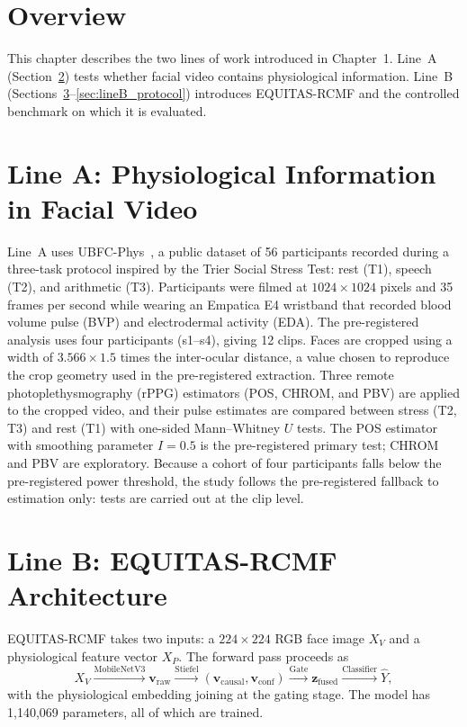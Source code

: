 \section{Overview}
This chapter describes the two lines of work introduced in Chapter~1. Line~A (Section~\ref{sec:lineA}) tests whether facial video contains physiological information. Line~B (Sections~\ref{sec:arch_overview}--\ref{sec:lineB_protocol}) introduces EQUITAS-RCMF and the controlled benchmark on which it is evaluated.

\section{Line A: Physiological Information in Facial Video}
\label{sec:lineA}
Line~A uses UBFC-Phys~\cite{sabour2023}, a public dataset of 56 participants recorded during a three-task protocol inspired by the Trier Social Stress Test: rest (T1), speech (T2), and arithmetic (T3). Participants were filmed at $1024 \times 1024$ pixels and 35 frames per second while wearing an Empatica E4 wristband that recorded blood volume pulse (BVP) and electrodermal activity (EDA). The pre-registered analysis uses four participants (s1--s4), giving 12 clips. Faces are cropped using a width of $3.566 \times 1.5$ times the inter-ocular distance, a value chosen to reproduce the crop geometry used in the pre-registered extraction. Three remote photoplethysmography (rPPG) estimators (POS, CHROM, and PBV) are applied to the cropped video, and their pulse estimates are compared between stress (T2, T3) and rest (T1) with one-sided Mann--Whitney $U$ tests. The POS estimator with smoothing parameter $I = 0.5$ is the pre-registered primary test; CHROM and PBV are exploratory. Because a cohort of four participants falls below the pre-registered power threshold, the study follows the pre-registered fallback to estimation only: tests are carried out at the clip level.

\section{Line B: EQUITAS-RCMF Architecture}
\label{sec:arch_overview}
EQUITAS-RCMF takes two inputs: a $224 \times 224$ RGB face image $X_V$ and a physiological feature vector $X_P$. The forward pass proceeds as
\begin{equation}
X_V \xrightarrow{\text{MobileNetV3}} \mathbf{v}_{\text{raw}}
\xrightarrow{\text{Stiefel}} (\mathbf{v}_{\text{causal}}, \mathbf{v}_{\text{conf}})
\xrightarrow{\text{Gate}} \mathbf{z}_{\text{fused}}
\xrightarrow{\text{Classifier}} \hat{Y},
\end{equation}
with the physiological embedding joining at the gating stage. The model has 1,140,069 parameters, all of which are trained.

